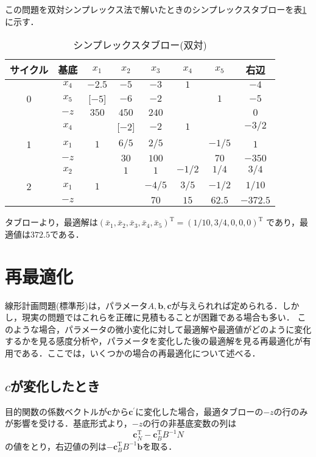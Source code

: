 \documentclass{jsreport}
\begin{document}
この問題を双対シンプレックス法で解いたときのシンプレックスタブローを表\ref{tab:dual_sol}に示す．
\begin{table}[htb]
  \centering
    \caption{シンプレックスタブロー(双対)}
    \begin{tabular}{c|c|ccccc|c}
    サイクル & 基底   & $x_1$ & $x_2$ & $x_3$ & $x_4$ & $x_5$ & 右辺  \\ \hline
            & $x_4$ & $-2.5$& $-5$  & $-3$  & $1$   &       & $-4$ \\
        0   & $x_5$ & [$-5$]& $-6$  & $-2$  &       &  $1$  & $-5$ \\ \cline{2-8}
            & $-z$  & $350$ & $450$ & $240$ &       &       & $0$   \\ \hline

            & $x_4$ &       &[$-2$] & $-2$  & $1$   &       & $-3/2$ \\
        1   & $x_1$ & $1$   & $6/5$ & $2/5$ &       &$-1/5$ & $1$ \\ \cline{2-8}
            & $-z$  &       & $30$  & $100$ &       & $70$  & $-350$   \\ \hline

            & $x_2$ &       & $1$   & $1$   & $-1/2$&$1/4$  & $3/4$ \\
        2   & $x_1$ & $1$   &       & $-4/5$& $3/5$ &$-1/2$ & $1/10$ \\ \cline{2-8}
            & $-z$  &       &       & $70$ & $15$   & $62.5$& $-372.5$   \\ \hline
    \end{tabular}
    \label{tab:dual_sol}
\end{table}

タブローより，最適解は$(\bar{x}_1, \bar{x}_2, \bar{x}_3, \bar{x}_4, \bar{x}_5)^{\mathrm{T}} = (1/10, 3/4, 0, 0, 0)^{\mathrm{T}}$
であり，最適値は$372.5$である．


\section{再最適化}
線形計画問題(標準形)は，パラメータ$A, \bm{b}, \bm{c}$が与えられれば定められる．しかし，現実の問題ではこれらを正確に見積もることが困難である場合も多い．
このような場合，パラメータの微小変化に対して最適解や最適値がどのように変化するかを見る感度分析や，パラメータを変化した後の最適解を見る再最適化が有用である．ここでは，いくつかの場合の再最適化について述べる．

\subsection{$c$が変化したとき}
目的関数の係数ベクトルが$\bm{c}$から$\bm{c}^{\prime}$に変化した場合，最適タブローの$-z$の行のみが影響を受ける．基底形式より，$-z$の行の非基底変数の列は
\begin{equation}
  \bm{c}_N^{\mathrm{T}} - \bm{c}_B^{\mathrm{T}} B^{-1} N
\end{equation}
の値をとり，右辺値の列は$-\bm{c}_B^{\mathrm{T}} B^{-1} \bm{b}$を取る．
\end{document}
